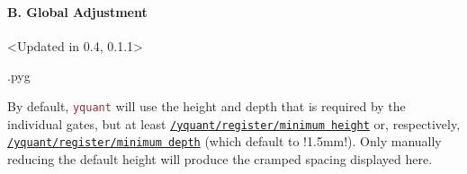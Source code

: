 \documentclass{scrartcl}
\makeatletter
\newenvironment{codeexample}{%
   \VerbatimEnvironment%
   \let\FVB@VerbatimOut\minted@FVB@VerbatimOut
   \let\FVE@VerbatimOut\minted@FVE@VerbatimOut
   \minted@configlang{tex}%
   \minted@fvset
   \begin{VerbatimOut}[codes={\catcode`\^^I=12},firstline,lastline]{\minted@jobname.pyg}%
}{
   \end{VerbatimOut}%
   \minted@langlinenoson%
   \savebox\codeexamplebox{ \minted@jobname.pyg}%
   \ifdim\wd\codeexamplebox>\dimexpr.5\linewidth-3mm\relax%
      \wd\codeexamplebox=.5\linewidth%
   \else%
      \wd\codeexamplebox=\dimexpr\wd\codeexamplebox+3mm\relax%
   \fi%
   \noindent\begin{minipage}{\wd\codeexamplebox}%
      \centering%
      \usebox\codeexamplebox%
   \end{minipage}%
   \begin{minipage}{\dimexpr\linewidth-\wd\codeexamplebox\relax}%
      \minted@pygmentize{\minted@lang}%
   \end{minipage}%
   \minted@langlinenosoff%
   \par%
}
\newenvironment{codeexample*}{%
   \VerbatimEnvironment%
   \let\FVB@VerbatimOut\minted@FVB@VerbatimOut
   \let\FVE@VerbatimOut\minted@FVE@VerbatimOut
   \minted@configlang{tex}%
   \minted@fvset
   \begin{VerbatimOut}[codes={\catcode`\^^I=12},firstline,lastline]{\minted@jobname.pyg}%
}{
   \end{VerbatimOut}%
   \minted@langlinenoson%
   \begin{adjustbox}{center}
       \minted@jobname.pyg %
   \end{adjustbox}\nopagebreak
   \minted@pygmentize{\minted@lang}%
   \minted@langlinenosoff%
   \par%
}
\def\pkg#1{\textcolor{brown}{\texttt{#1}}}
\def\style#1{\hyperref[style:#1]{\texttt{#1}}}
\def\Yquant{\pkg{yquant}}
\makeatother
\begin{document}
            \clearpage
            \paragraph{B. Global Adjustment}\leavevmode
               \begin{example}
                  \begin{codeexample*}
                  \end{codeexample*}
               \end{example}

               \begin{example}<Updated in 0.4, 0.1.1>
                  \begin{codeexample}
                  \end{codeexample}
                  By default, \Yquant{} will use the height and depth that is required by the individual gates, but at least \style{/yquant/register/minimum height} or, respectively, \style{/yquant/register/minimum depth} (which default to \tex!1.5mm!).
                  Only manually reducing the default height will produce the cramped spacing displayed here.
               \end{example}

            \clearpage
\end{document}

